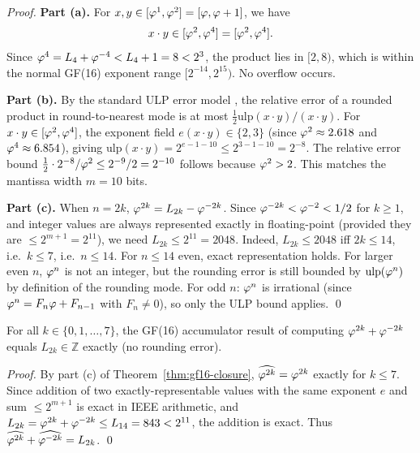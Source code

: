 \begin{proof}
\textbf{Part (a).}  For \(x, y \in [\varphi^{1}, \varphi^{2}] = [\varphi, \varphi+1]\),
we have
\[
  x \cdot y \in [\varphi^{2}, \varphi^{4}] = [\varphi^2, \varphi^4].
\]
Since \(\varphi^{4} = L_4 + \varphi^{-4} < L_4 + 1 = 8 < 2^3\), the
product lies in \([2, 8)\), which is within the normal GF(16)
exponent range \([2^{-14}, 2^{15})\).  No overflow occurs.

\textbf{Part (b).}  By the standard ULP error model
\cite{muller_fp_handbook}, the relative error of a rounded product
in round-to-nearest mode is at most \(\frac{1}{2}\mathrm{ulp}(x \cdot y)
/ (x \cdot y)\).  For \(x \cdot y \in [\varphi^{2}, \varphi^{4}]\), the
exponent field \(e(x \cdot y) \in \{2, 3\}\) (since
\(\varphi^{2} \approx 2.618\) and \(\varphi^{4} \approx 6.854\)), giving
\(\mathrm{ulp}(x \cdot y) = 2^{e-1-10} \leq 2^{3-1-10} = 2^{-8}\).
The relative error bound \(\frac{1}{2} \cdot 2^{-8} / \varphi^{2} \leq
2^{-9}/2 = 2^{-10}\) follows because \(\varphi^{2} > 2\).  This
matches the mantissa width \(m = 10\) bits.

\textbf{Part (c).}  When \(n = 2k\), \(\varphi^{2k} = L_{2k} -
\varphi^{-2k}\).  Since \(\varphi^{-2k} < \varphi^{-2} < 1/2\) for
\(k \geq 1\), and integer values are always represented exactly in
floating-point (provided they are \(\leq 2^{m+1} = 2^{11}\)), we need
\(L_{2k} \leq 2^{11} = 2048\).  Indeed, \(L_{2k} \leq 2048\) iff
\(2k \leq 14\), i.e.\ \(k \leq 7\), i.e.\ \(n \leq 14\).
For \(n \leq 14\) even, exact representation holds.
For larger even \(n\), \(\varphi^{n}\) is not an integer, but the
rounding error is still bounded by \(\mathrm{ulp}(\varphi^{n})\) by
definition of the rounding mode.
For odd \(n\): \(\varphi^{n}\) is irrational (since
\(\varphi^{n} = F_n \varphi + F_{n-1}\) with \(F_n \neq 0\)), so only
the ULP bound applies.
\qed
\end{proof}

\begin{corollary}
\label{cor:lucas-closure}
For all \(k \in \{0, 1, \ldots, 7\}\), the GF(16) accumulator
result of computing \(\varphi^{2k} + \varphi^{-2k}\) equals
\(L_{2k} \in \mathbb{Z}\) exactly (no rounding error).
\end{corollary}

\begin{proof}
By part (c) of Theorem~\ref{thm:gf16-closure},
\(\widehat{\varphi^{2k}} = \varphi^{2k}\) exactly for \(k \leq 7\).
Since addition of two exactly-representable values with the same
exponent \(e\) and sum \(\leq 2^{m+1}\) is exact in IEEE arithmetic,
and \(L_{2k} = \varphi^{2k} + \varphi^{-2k} \leq L_{14} = 843 < 2^{11}\),
the addition is exact.  Thus \(\widehat{\varphi^{2k}} +
\widehat{\varphi^{-2k}} = L_{2k}\).
\qed
\end{proof}

